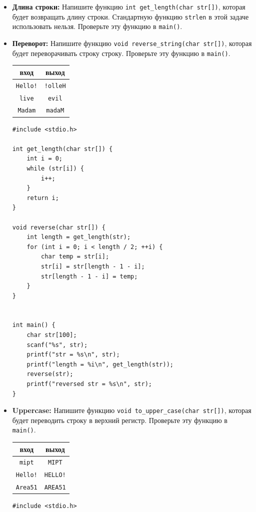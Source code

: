 \documentclass{article}
\begin{document}
\begin{itemize}
\item \textbf{Длина строки:} Напишите функцию \texttt{int get\_length(char str[])}, которая будет возвращать длину строки. Стандартную функцию \texttt{strlen} в этой задаче использовать нельзя. Проверьте эту функцию в \texttt{main()}.
\item \textbf{Переворот:} Напишите функцию \texttt{void reverse\_string(char str[])}, которая будет переворачивать строку строку. Проверьте эту функцию в \texttt{main()}.
\begin{center}
\begin{tabular}{ c | c }
 вход & выход \\ \hline
 \texttt{Hello!} & \texttt{!olleH}  \\ 
 \texttt{live} & \texttt{evil}  \\ 
 \texttt{Madam} & \texttt{madaM}  \\ 
\end{tabular}
\end{center}

\begin{lstlisting}[backgroundcolor = \color{solcolor}]
#include <stdio.h>

int get_length(char str[]) {
    int i = 0;
    while (str[i]) {
        i++;
    }
    return i;
}

void reverse(char str[]) {
    int length = get_length(str);
    for (int i = 0; i < length / 2; ++i) {
        char temp = str[i];
        str[i] = str[length - 1 - i];
        str[length - 1 - i] = temp;
    }
}


int main() {
    char str[100];
    scanf("%s", str);
    printf("str = %s\n", str);
    printf("length = %i\n", get_length(str));
    reverse(str);
    printf("reversed str = %s\n", str);
}
\end{lstlisting}

\item \textbf{Uppercase:} Напишите функцию \texttt{void to\_upper\_case(char str[])}, которая будет переводить строку в верхний регистр. Проверьте эту функцию в \texttt{main()}.
\begin{center}
\begin{tabular}{ c | c }
 вход & выход \\ \hline
 \texttt{mipt} & \texttt{MIPT} \\
 \texttt{Hello!} & \texttt{HELLO!}  \\ 
 \texttt{Area51} & \texttt{AREA51} \\
\end{tabular}
\end{center}
\begin{lstlisting}[backgroundcolor = \color{solcolor}]
#include <stdio.h>


\end{lstlisting}
\end{itemize}
\end{document}
